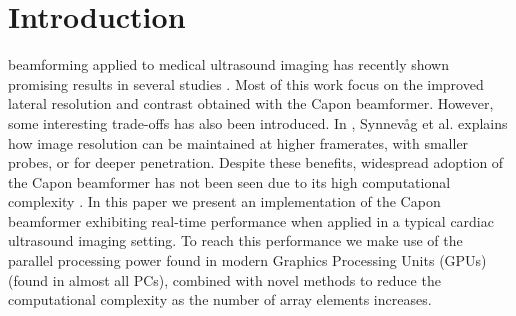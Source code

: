 \documentclass[journal]{IEEEtran}
\begin{document}
%
\IEEEpeerreviewmaketitle



\section{Introduction}
% 
% 
% 
% 

 beamforming \cite{Capon1969} applied to medical ultrasound imaging has recently shown promising results in several studies \cite{Synnevag2007, Austeng2008, Vignon2008, Viola, Mehdizadeh2012}. Most of this work focus on the improved lateral resolution and contrast obtained with the Capon beamformer. However, some interesting trade-offs has also been introduced. In \cite{Synnevag2009}, Synnev\aa{}g et al. explains how image resolution can be maintained at higher framerates, with smaller probes, or for deeper penetration. Despite these benefits, widespread adoption of the Capon beamformer has not been seen due to its high computational complexity \cite{So2011}. In this paper we present an implementation of the Capon beamformer exhibiting real-time performance when applied in a typical cardiac ultrasound imaging setting. To reach this performance we make use of the parallel processing power found in modern Graphics Processing Units (GPUs) (found in almost all PCs), combined with novel methods to reduce the computational complexity as the number of array elements increases. 
\end{document}
